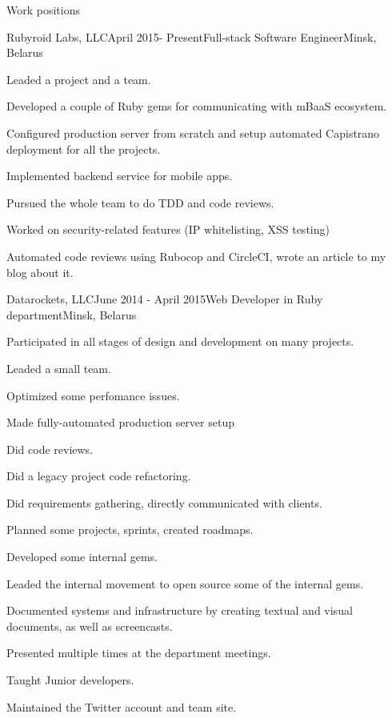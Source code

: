 \documentclass{resume} %
\begin{document}

\begin{rSection}{Work positions}

\begin{rSubsection}{Rubyroid Labs, LLC}{April 2015- Present}{Full-stack Software Engineer}{Minsk, Belarus}
\item	Leaded a project and a team.
\item	Developed a couple of Ruby gems for communicating with mBaaS ecosystem.
\item Configured production server from scratch and setup automated Capistrano deployment for all the projects.
\item Implemented backend service for mobile apps.
\item Pursued the whole team to do TDD and code reviews. 
\item Worked on security-related features (IP whitelisting, XSS testing)
\item Automated code reviews using Rubocop and CircleCI, wrote an article to my blog about it.
\end{rSubsection}

\begin{rSubsection}{Datarockets, LLC}{June 2014 - April 2015}{Web Developer in Ruby department}{Minsk, Belarus}
\item Participated in all stages of design and development on many projects.
\item	Leaded a small team.
\item	Optimized some perfomance issues.
\item Made fully-automated production server setup
\item Did code reviews.
\item Did a legacy project code refactoring.
\item	Did requirements gathering, directly communicated with clients.
\item	Planned some projects, sprints, created roadmaps.
\item	Developed some internal gems.
\item	Leaded the internal movement to open source some of the internal gems.
\item	Documented systems and infrastructure by creating textual and visual documents, as well as screencasts.
\item Presented multiple times at the department meetings.
\item	Taught Junior developers.
\item	Maintained the Twitter account and team site.
\end{rSubsection}

\end{rSection}
\end{document}
